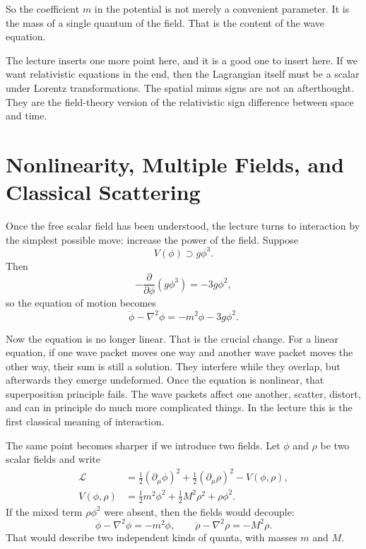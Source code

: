 So the coefficient \(m\) in the potential is not merely a convenient parameter. It is the mass of a single quantum of the field. That is the content of the wave equation.

The lecture inserts one more point here, and it is a good one to insert here. If we want relativistic equations in the end, then the Lagrangian itself must be a scalar under Lorentz transformations. The spatial minus signs are not an afterthought. They are the field-theory version of the relativistic sign difference between space and time.

\section{Nonlinearity, Multiple Fields, and Classical Scattering}

Once the free scalar field has been understood, the lecture turns to interaction by the simplest possible move: increase the power of the field. Suppose
\begin{equation}
V(\phi)\supset g\phi^3.
\end{equation}
Then
\begin{equation}
-\frac{\partial}{\partial \phi}(g\phi^3)=-3g\phi^2,
\end{equation}
so the equation of motion becomes
\begin{equation}
\ddot\phi-\nabla^2\phi=-m^2\phi-3g\phi^2.
\end{equation}

Now the equation is no longer linear. That is the crucial change. For a linear equation, if one wave packet moves one way and another wave packet moves the other way, their sum is still a solution. They interfere while they overlap, but afterwards they emerge undeformed. Once the equation is nonlinear, that superposition principle fails. The wave packets affect one another, scatter, distort, and can in principle do much more complicated things. In the lecture this is the first classical meaning of interaction.

The same point becomes sharper if we introduce two fields. Let \(\phi\) and \(\rho\) be two scalar fields and write
\begin{align}
\mathcal L
&=
\frac12 (\partial_\mu\phi)^2
+
\frac12 (\partial_\mu\rho)^2
-
V(\phi,\rho),
\\
V(\phi,\rho)
&=
\frac12 m^2\phi^2+\frac12 M^2\rho^2+\rho\phi^2.
\end{align}
If the mixed term \(\rho\phi^2\) were absent, then the fields would decouple:
\begin{equation}
\ddot\phi-\nabla^2\phi=-m^2\phi,
\qquad
\ddot\rho-\nabla^2\rho=-M^2\rho.
\end{equation}
That would describe two independent kinds of quanta, with masses \(m\) and \(M\).

